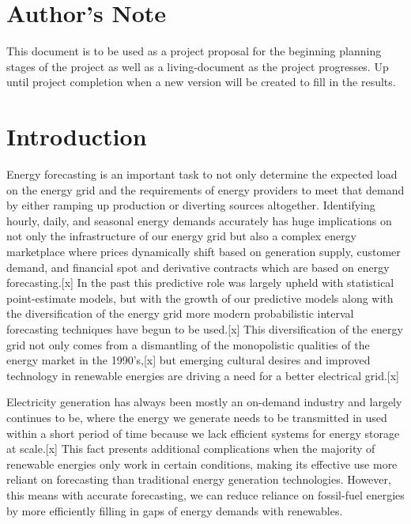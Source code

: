 \documentclass[sigconf]{acmart}
\begin{document}
\maketitle

\section{Author's Note}
This document is to be used as a project proposal for the beginning planning stages of the project as well as a living-document as the project progresses. Up until project completion when a new version will be created to fill in the results.

\section{Introduction}
Energy forecasting is an important task to not only determine the expected load on the energy grid and the requirements of energy providers to meet that demand by either ramping up production or diverting sources altogether. Identifying hourly, daily, and seasonal energy demands accurately has huge implications on not only the infrastructure of our energy grid but also a complex energy marketplace where prices dynamically shift based on generation supply, customer demand, and financial spot and derivative contracts which are based on energy forecasting.[x] In the past this predictive role was largely upheld with statistical point-estimate models, but with the growth of our predictive models along with the diversification of the energy grid more modern probabilistic interval forecasting techniques have begun to be used.[x] This diversification of the energy grid not only comes from a dismantling of the monopolistic qualities of the energy market in the 1990's,[x] but emerging cultural desires and improved technology in renewable energies are driving a need for a better electrical grid.[x] 

Electricity generation has always been mostly an on-demand industry and largely continues to be, where the energy we generate needs to be transmitted in used within a short period of time because we lack efficient systems for energy storage at scale.[x] This fact presents additional complications when the majority of renewable energies only work in certain conditions, making its effective use more reliant on forecasting than traditional energy generation technologies. However, this means with accurate forecasting, we can reduce reliance on fossil-fuel energies by more efficiently filling in gaps of energy demands with renewables.
\end{document}
